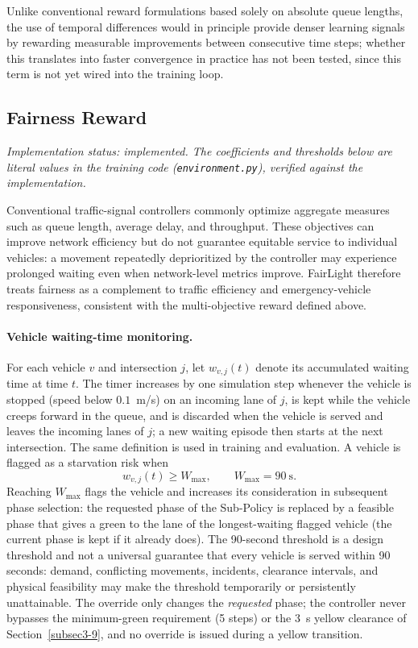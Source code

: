 \documentclass[3p,times]{elsarticle}
\theoremstyle{plain}
\theoremstyle{definition}
\begin{document}
Unlike conventional reward formulations based solely on absolute queue
lengths, the use of temporal differences would in principle provide
denser learning signals by rewarding measurable improvements between
consecutive time steps; whether this translates into faster convergence
in practice has not been tested, since this term is not yet wired into
the training loop.

\subsection{Fairness Reward}

\textit{Implementation status: implemented. The coefficients and
thresholds below are literal values in the training code
(\texttt{environment.py}), verified against the implementation.}

Conventional traffic-signal controllers commonly optimize aggregate measures such as queue
length, average delay, and throughput. These objectives can improve network efficiency but do
not guarantee equitable service to individual vehicles: a movement repeatedly deprioritized by
the controller may experience prolonged waiting even when network-level metrics improve.
FairLight therefore treats fairness as a complement to traffic efficiency and emergency-vehicle
responsiveness, consistent with the multi-objective reward defined above.

\paragraph{Vehicle waiting-time monitoring.}
For each vehicle $v$ and intersection $j$, let $w_{v,j}(t)$ denote its accumulated waiting time
at time $t$. The timer increases by one simulation step whenever the vehicle is stopped (speed
below $0.1$~m/s) on an incoming lane of $j$, is kept while the vehicle creeps forward in the
queue, and is discarded when the vehicle is served and leaves the incoming lanes of $j$; a new
waiting episode then starts at the next intersection. The same definition is used in training
and evaluation. A vehicle is flagged as a starvation risk when
\begin{equation}
w_{v,j}(t)\ge W_{\max},\qquad W_{\max}=90\ \text{s}.
\end{equation}
Reaching $W_{\max}$ flags the vehicle and increases its consideration in subsequent phase
selection: the requested phase of the Sub-Policy is replaced by a feasible phase that gives a
green to the lane of the longest-waiting flagged vehicle (the current phase is kept if it
already does). The 90-second threshold is a design threshold and not a universal guarantee
that every vehicle is served within 90 seconds: demand, conflicting movements, incidents,
clearance intervals, and physical feasibility may make the threshold temporarily or
persistently unattainable. The override only changes the \emph{requested} phase; the controller
never bypasses the minimum-green requirement (5 steps) or the 3~s yellow clearance of
Section~\ref{subsec3-9}, and no override is issued during a yellow transition.
\end{document}

